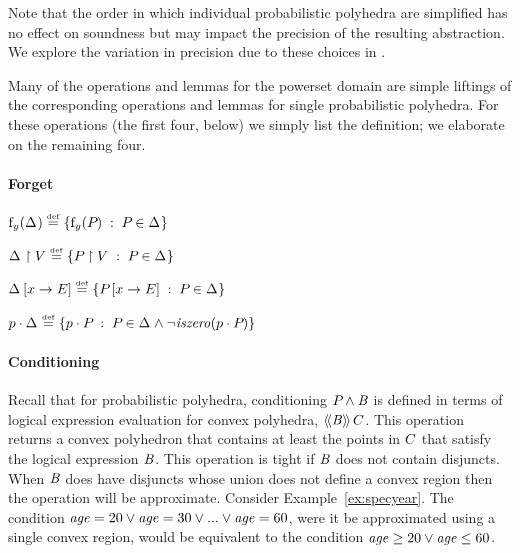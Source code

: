 Note that the order in which individual probabilistic polyhedra are
simplified has no effect on soundness but may impact the precision of
the resulting abstraction. We explore the variation in precision due
to these choices in .

Many of the operations and lemmas for the powerset domain are simple liftings
of the corresponding operations and lemmas for single probabilistic polyhedra.
For these operations (the first four, below) we simply list the
definition; we elaborate on the remaining four.

\paragraph{Forget} $ \mathrm{f}_{y}(\Delta_{}) \stackrel{\smash{\scriptscriptstyle \mathrm{def}}}=
\left\{ \mathrm{f}_{y}(P_{}) \;:\; P_{} \in \Delta_{} \right\} $

\vspace*{.1in}
\noindent
{} $ \Delta_{} \upharpoonright V \stackrel{\smash{\scriptscriptstyle \mathrm{def}}}=
\left\{ P_{} \upharpoonright V \;:\; P_{} \in \Delta_{} \right\} $


\vspace*{.1in}
\noindent
{} $ \Delta_{} \left[ x \rightarrow E \right] \stackrel{\smash{\scriptscriptstyle \mathrm{def}}}=
  \left\{ P_{} \left[ x \rightarrow E \right] \;:\; P_{} \in \Delta_{} \right\} $


\vspace*{.1in}
\noindent
{} $ p \cdot \Delta_{} \stackrel{\smash{\scriptscriptstyle \mathrm{def}}}= \left\{ p
  \cdot P_{} \;:\; P_{} \in \Delta_{} \wedge \neg \mathit{iszero}(p \cdot P_{}) \right\} $


\paragraph{Conditioning}
Recall that for probabilistic polyhedra, conditioning $
P_{} \wedge \mathit{B} $ is defined in terms of logical expression
evaluation for convex polyhedra, $ \langle\!\langle{\mathit{B}}\rangle\!\rangle\,{C} $. This
operation returns a convex polyhedron that contains at least the points
in $ C $ that satisfy the logical expression $ \mathit{B} $. This
operation is tight if $ \mathit{B} $ does not contain disjuncts.  When
$ \mathit{B} $ does have disjuncts whose union does not define
a convex region then the operation will be approximate.  Consider
Example~\ref{ex:specyear}. The condition 
$ \mathit{age} = 20 \vee \mathit{age} = 30 \vee ... \vee \mathit{age} = 60 $,
were it be approximated using a single convex region, would be
equivalent to the condition $ \mathit{age} \geq 20 \vee \mathit{age} \leq 60
$.

